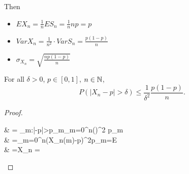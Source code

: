 \begin{exercise}
	Then
	\begin{itemize}
		\item $EX_{n}=\frac{1}{n}ES_n=\frac{1}{n}np=p$
		\item $VarX_{n}=\frac{1}{n^{2}}\cdot VarS_n= \frac{p(1-p)}{n}$
		\item $\sigma_{X_{n}}=\sqrt{\frac{np(1-p)}{n}}$
	\end{itemize}
	\begin{prop}
		For all $\delta>0$, $p \in [0,1]$, $n \in \mathbb{N}$,
		\[
			P(\left|X_n -p\right|>\delta)\le \frac{1}{\delta^2}\frac{p(1-p)}{n}
			.\]
		\begin{proof}
			\begin{flalign*}
				 & = \sum_{m:\left|-p\right|>\delta }{p_{m}}\le \sum_{m=0}^{n}{\left(\right)^2 p_m } \\
				           & =\sum_{m=0}^{n}{\left(X_{n}(m)-p\right)^{2}p_m}=E     \\
				           & =X_n = 
			\end{flalign*}
		\end{proof}
	\end{prop}
\end{exercise}

